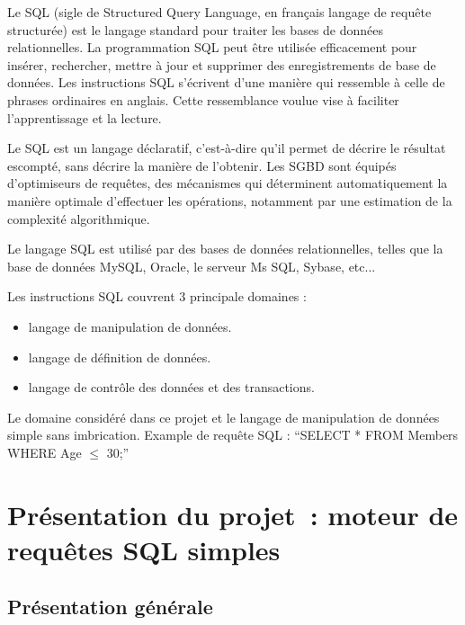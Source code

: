 \documentclass[oneside,13pt,a4paper]{report}
\begin{document}
Le SQL (sigle de Structured Query Language, en français langage de requête structurée) est le langage standard pour traiter les bases de données relationnelles.
La programmation SQL peut être utilisée efficacement pour insérer, rechercher, mettre à jour et supprimer des enregistrements de base de données.
Les instructions SQL s'écrivent d'une manière qui ressemble à celle de phrases ordinaires en anglais. Cette ressemblance voulue vise à faciliter l'apprentissage et la lecture.

Le SQL est un langage déclaratif, c'est-à-dire qu'il permet de décrire le résultat escompté, sans décrire la manière de l'obtenir.
Les SGBD sont équipés d'optimiseurs de requêtes, des mécanismes qui déterminent automatiquement la manière optimale d'effectuer les opérations,
notamment par une estimation de la complexité algorithmique.

Le langage SQL est utilisé par des bases de données relationnelles, telles que la base de données MySQL, Oracle, le serveur Ms SQL, Sybase, etc...

Les instructions SQL couvrent 3 principale domaines :
\begin{itemize}
	\item langage de manipulation de données.
	\item langage de définition de données.
	\item langage de contrôle des données et des transactions.
\end{itemize}
\vspace{0.3cm}

Le domaine considéré dans ce projet et le langage de manipulation de données simple sans imbrication.
Example de requête SQL : \enquote{SELECT * FROM Members WHERE Age $ \leq $ 30;}


\chapter{Présentation du projet : moteur de requêtes SQL simples}

\section{Présentation générale}
\end{document}

